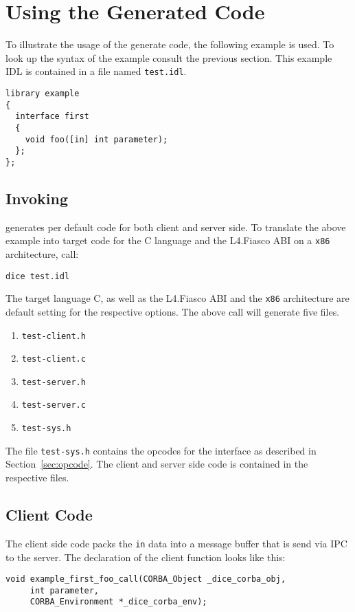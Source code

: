 \chapter{Using the Generated Code}
To illustrate the usage of the generate code, the following example
is used. To look up the syntax of the example consult the
previous section. This example IDL is contained in a
file named \verb|test.idl|.

\begin{verbatim}
library example
{
  interface first
  {
    void foo([in] int parameter);
  };
};
\end{verbatim}

\section{Invoking \dice{}}
\dice{} generates per default code for both client and server side. To
translate the above example into target code for the C language and the
L4.Fiasco ABI on a \verb|x86| architecture, call:

\begin{verbatim}
dice test.idl
\end{verbatim}

The target language C, as well as the L4.Fiasco ABI and the \verb|x86|
architecture are default setting for the respective options. The above call
will generate five files.

\begin{enumerate}
\item \verb|test-client.h|
\item \verb|test-client.c|
\item \verb|test-server.h|
\item \verb|test-server.c|
\item \verb|test-sys.h|
\end{enumerate}

The file \verb|test-sys.h| contains the opcodes for the interface as described
in Section~\ref{sec:opcode}. The client and server side code is contained in
the respective files.

\section{Client Code}
The client side code packs the \verb|in| data into a message buffer that is
send via IPC to the server.  The declaration of the client function looks like
this:

\begin{verbatim}
void example_first_foo_call(CORBA_Object _dice_corba_obj,
     int parameter,
     CORBA_Environment *_dice_corba_env);
\end{verbatim}

